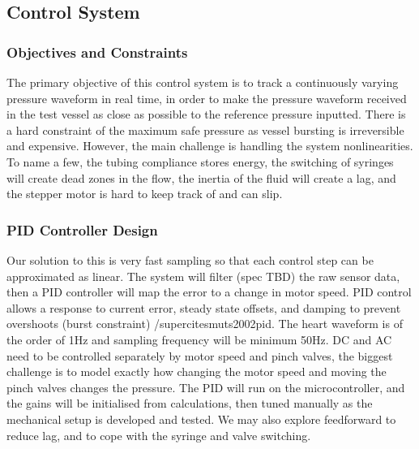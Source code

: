 \documentclass[10pt, a4paper]{article}
\begin{document}
\subsection{Control System}
\subsubsection{Objectives and Constraints}
The primary objective of this control system is to track a continuously varying pressure waveform in real time, in order to make the pressure waveform received in the test vessel as close as possible to the reference pressure inputted. There is a hard constraint of the maximum safe pressure as vessel bursting is irreversible and expensive. However, the main challenge is handling the system nonlinearities. To name a few, the tubing compliance stores energy, the switching of syringes will create dead zones in the flow, the inertia of the fluid will create a lag, and the stepper motor is hard to keep track of and can slip.
\subsubsection{PID Controller Design}
Our solution to this is very fast sampling so that each control step can be approximated as linear. The system will filter (spec TBD) the raw sensor data, then a PID controller will map the error to a change in motor speed. PID control allows a response to current error, steady state offsets, and damping to prevent overshoots (burst constraint) /supercite{smuts2002pid}. The heart waveform is of the order of 1Hz and sampling frequency will be minimum 50Hz. DC and AC need to be controlled separately by motor speed and pinch valves, the biggest challenge is to model exactly how changing the motor speed and moving the pinch valves changes the pressure. The PID will run on the microcontroller, and the gains will be initialised from calculations, then tuned manually as the mechanical setup is developed and tested. We may also explore feedforward to reduce lag, and to cope with the syringe and valve switching.
\end{document}
